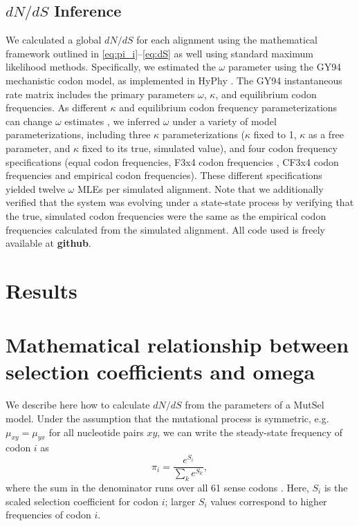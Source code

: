 \documentclass[11pt]{article}
\begin{document}
\subsection*{$dN/dS$ Inference}
We calculated a global $dN/dS$ for each alignment using the mathematical framework outlined in \eqref{eq:pi_i}--\eqref{eq:dS} as well using standard maximum likelihood methods. Specifically, we estimated the $\omega$ parameter using the GY94 mechanistic codon model\cite{GoldmanYang1994,NielsenYang1998}, as implemented in HyPhy \cite{KosakovskyPondetal2005}. The GY94 instantaneous rate matrix includes the primary parameters $\omega$, $\kappa$, and equilibrium codon frequencies. As different $\kappa$ and equilibrium codon frequency parameterizations can change $\omega$ estimates \cite{YN00, Yang2006, ZhangYu2006}, we inferred $\omega$ under a variety of model parameterizations, including three $\kappa$ parameterizations ($\kappa$ fixed to 1, $\kappa$ as a free parameter, and $\kappa$ fixed to its true, simulated value), and four codon frequency specifications (equal codon frequencies,  F3x4 codon frequencies \cite{MuseGaut1994}, CF3x4 codon frequencies \cite{Pond2010} and empirical codon frequencies). These different specifications yielded twelve $\omega$ MLEs per simulated alignment. Note that we additionally verified that the system was evolving under a state-state process by verifying that the true, simulated codon frequencies were the same as the empirical codon frequencies calculated from the simulated alignment. All code used is freely available at \textbf{github}. 



\section*{Results}


\section*{Mathematical relationship between selection coefficients and omega}


We describe here how to calculate $dN/dS$ from the parameters of a MutSel model. Under the assumption that the mutational process is symmetric, e.g. $\mu_{xy}=\mu_{yx}$ for all nucleotide pairs $xy$, we can write the steady-state frequency of codon $i$ as 
\begin{equation}\label{eq:pi_i}
 \pi_i=\frac{e^{S_i}}{\sum_k e^{S_k}},
\end{equation}
where the sum in the denominator runs over all 61 sense codons \cite{SellaHirsh2005}. Here, $S_i$ is the scaled selection coefficient for codon $i$; larger $S_i$ values correspond to higher frequencies of codon $i$.
\end{document}
